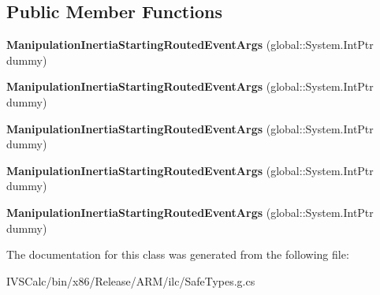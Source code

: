 \subsection*{Public Member Functions}
\begin{DoxyCompactItemize}
\item 
\mbox{\label{class_windows_1_1_u_i_1_1_xaml_1_1_input_1_1_manipulation_inertia_starting_routed_event_args_adff67b10324e121de606a78fbd627f0d}} 
{\bfseries Manipulation\+Inertia\+Starting\+Routed\+Event\+Args} (global\+::\+System.\+Int\+Ptr dummy)
\item 
\mbox{\label{class_windows_1_1_u_i_1_1_xaml_1_1_input_1_1_manipulation_inertia_starting_routed_event_args_adff67b10324e121de606a78fbd627f0d}} 
{\bfseries Manipulation\+Inertia\+Starting\+Routed\+Event\+Args} (global\+::\+System.\+Int\+Ptr dummy)
\item 
\mbox{\label{class_windows_1_1_u_i_1_1_xaml_1_1_input_1_1_manipulation_inertia_starting_routed_event_args_adff67b10324e121de606a78fbd627f0d}} 
{\bfseries Manipulation\+Inertia\+Starting\+Routed\+Event\+Args} (global\+::\+System.\+Int\+Ptr dummy)
\item 
\mbox{\label{class_windows_1_1_u_i_1_1_xaml_1_1_input_1_1_manipulation_inertia_starting_routed_event_args_adff67b10324e121de606a78fbd627f0d}} 
{\bfseries Manipulation\+Inertia\+Starting\+Routed\+Event\+Args} (global\+::\+System.\+Int\+Ptr dummy)
\item 
\mbox{\label{class_windows_1_1_u_i_1_1_xaml_1_1_input_1_1_manipulation_inertia_starting_routed_event_args_adff67b10324e121de606a78fbd627f0d}} 
{\bfseries Manipulation\+Inertia\+Starting\+Routed\+Event\+Args} (global\+::\+System.\+Int\+Ptr dummy)
\end{DoxyCompactItemize}


The documentation for this class was generated from the following file\+:\begin{DoxyCompactItemize}
\item 
I\+V\+S\+Calc/bin/x86/\+Release/\+A\+R\+M/ilc/Safe\+Types.\+g.\+cs\end{DoxyCompactItemize}
